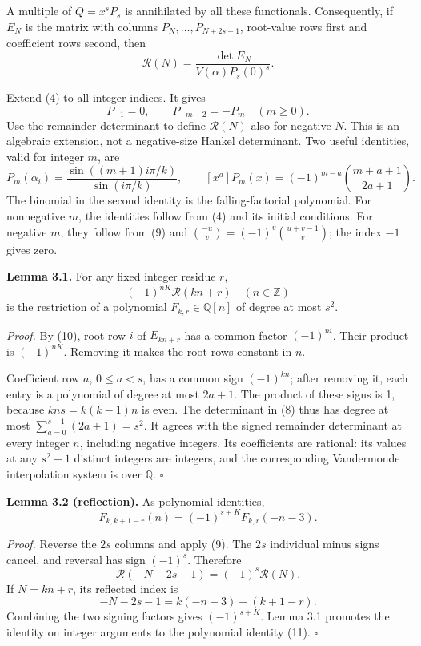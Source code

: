 \documentclass[
  11pt,
]{article}
\begin{document}
A multiple of \(Q=x^sP_s\) is annihilated by all these functionals.
Consequently, if \(E_N\) is the matrix with columns
\(P_N,\ldots,P_{N+2s-1}\), root-value rows first and coefficient rows
second, then \[
 \mathcal R(N)=\frac{\det E_N}{V(\alpha)P_s(0)^s}.
 \tag{8}
\]

Extend (4) to all integer indices. It gives \[
 P_{-1}=0,\qquad P_{-m-2}=-P_m\quad(m\ge0).
 \tag{9}
\] Use the remainder determinant to define \(\mathcal R(N)\) also for
negative \(N\). This is an algebraic extension, not a negative-size
Hankel determinant. Two useful identities, valid for integer \(m\), are
\[
 P_m(\alpha_i)=\frac{\sin((m+1)i\pi/k)}{\sin(i\pi/k)},\qquad
 [x^a]P_m(x)=(-1)^{m-a}\binom{m+a+1}{2a+1}.
 \tag{10}
\] The binomial in the second identity is the falling-factorial
polynomial. For nonnegative \(m\), the identities follow from (4) and
its initial conditions. For negative \(m\), they follow from (9) and
\(\binom{-u}{v}=(-1)^v\binom{u+v-1}{v}\); the index \(-1\) gives zero.

\textbf{Lemma 3.1.} For any fixed integer residue \(r\), \[
 (-1)^{nK}\mathcal R(kn+r)\quad(n\in\mathbb Z)
\] is the restriction of a polynomial \(F_{k,r}\in\mathbb Q[n]\) of
degree at most \(s^2\).

\emph{Proof.} By (10), root row \(i\) of \(E_{kn+r}\) has a common
factor \((-1)^{ni}\). Their product is \((-1)^{nK}\). Removing it makes
the root rows constant in \(n\).

Coefficient row \(a\), \(0\le a<s\), has a common sign \((-1)^{kn}\);
after removing it, each entry is a polynomial of degree at most
\(2a+1\). The product of these signs is 1, because \(kns=k(k-1)n\) is
even. The determinant in (8) thus has degree at most
\(\sum_{a=0}^{s-1}(2a+1)=s^2\). It agrees with the signed remainder
determinant at every integer \(n\), including negative integers. Its
coefficients are rational: its values at any \(s^2+1\) distinct integers
are integers, and the corresponding Vandermonde interpolation system is
over \(\mathbb Q\). \(\square\)

\textbf{Lemma 3.2 (reflection).} As polynomial identities, \[
 F_{k,k+1-r}(n)=(-1)^{s+K}F_{k,r}(-n-3).
 \tag{11}
\]

\emph{Proof.} Reverse the \(2s\) columns and apply (9). The \(2s\)
individual minus signs cancel, and reversal has sign \((-1)^s\).
Therefore \[
 \mathcal R(-N-2s-1)=(-1)^s\mathcal R(N).
\] If \(N=kn+r\), its reflected index is \[
 -N-2s-1=k(-n-3)+(k+1-r).
\] Combining the two signing factors gives \((-1)^{s+K}\). Lemma 3.1
promotes the identity on integer arguments to the polynomial identity
(11). \(\square\)
\end{document}
